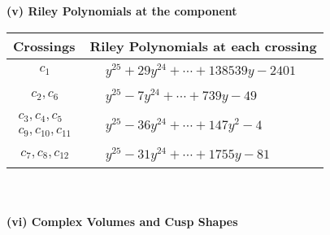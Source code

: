 \documentclass[1p]{elsarticle_modified}
\theoremstyle{definition}
\begin{document}
\newpage\renewcommand{\arraystretch}{1}
\flushleft \textbf{(v) Riley Polynomials at the component}\newline \\
\begin{tabular}{m{50pt}|m{274pt}}
Crossings & \hspace{64pt}Riley Polynomials at each crossing \\
\hline $$\begin{aligned}c_{1}\end{aligned}$$&$\begin{aligned}
&y^{25}+29 y^{24}+\cdots+138539 y-2401
\end{aligned}$\\
\hline $$\begin{aligned}c_{2},c_{6}\end{aligned}$$&$\begin{aligned}
&y^{25}-7 y^{24}+\cdots+739 y-49
\end{aligned}$\\
\hline $$\begin{aligned}c_{3},c_{4},c_{5}\\c_{9},c_{10},c_{11}\end{aligned}$$&$\begin{aligned}
&y^{25}-36 y^{24}+\cdots+147 y^2-4
\end{aligned}$\\
\hline $$\begin{aligned}c_{7},c_{8},c_{12}\end{aligned}$$&$\begin{aligned}
&y^{25}-31 y^{24}+\cdots+1755 y-81
\end{aligned}$\\
\hline
\end{tabular}\\~\\
\newpage\flushleft \textbf{(vi) Complex Volumes and Cusp Shapes}
\end{document}
